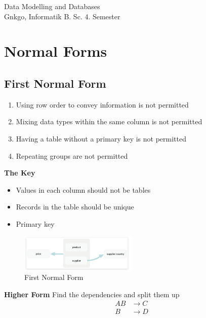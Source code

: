 \documentclass{article}
\begin{document}
\begin{titlepage}
    \thispagestyle{fancy}
    \renewcommand{\headrulewidth}{1pt}

    \center
    \vspace*{1.0cm}
    \Large Data Modelling and Databases \\[.5 cm]
    \large
    \normalsize
    Gnkgo, Informatik B. Sc. 4. Semester \\
    \vfill
\end{titlepage}

\tableofcontents
\newpage %


\section{Normal Forms}

\subsection{First Normal Form}
\begin{enumerate}
    \item Using row order to convey information is not permitted
    \item Mixing data types within the same column is not permitted
    \item Having a table without a primary key is not permitted
    \item Repeating groups are not permitted
\end{enumerate}

\textbf{The Key}
\begin{itemize}
    \item Values in each column should not be tables
    \item Records in the table should be unique
    \item Primary key
\end{itemize}

\begin{figure}[h]
    \centering
    \includegraphics[width=0.5\textwidth]{assets/first_normal_form.png}
    \caption{First Normal Form}
\end{figure}
\textbf{Higher Form}
Find the dependencies and split them up
\begin{align*}
    AB & \rightarrow C \\
    B  & \rightarrow D
\end{align*}
\end{document}
